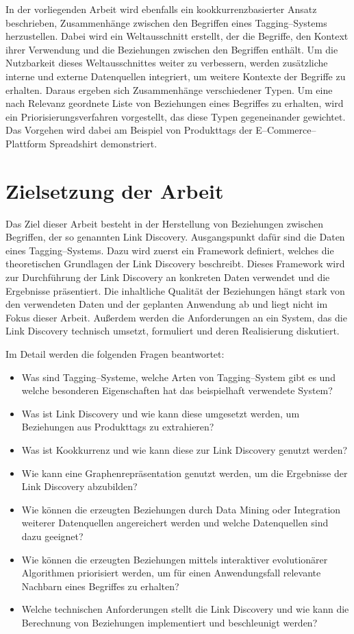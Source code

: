 In der vorliegenden Arbeit wird ebenfalls ein kookkurrenzbasierter Ansatz beschrieben, Zusammenhänge zwischen den Begriffen eines Tagging--Systems herzustellen. Dabei wird ein Weltausschnitt erstellt, der die Begriffe, den Kontext ihrer Verwendung und die Beziehungen zwischen den Begriffen enthält. Um die Nutzbarkeit dieses Weltausschnittes weiter zu verbessern, werden zusätzliche interne und externe Datenquellen integriert, um weitere Kontexte der Begriffe zu erhalten. Daraus ergeben sich Zusammenhänge verschiedener Typen. Um eine nach Relevanz geordnete Liste von Beziehungen eines Begriffes zu erhalten, wird ein Priorisierungsverfahren vorgestellt, das diese Typen gegeneinander gewichtet. Das Vorgehen wird dabei am Beispiel von Produkttags der E--Commerce--Plattform Spreadshirt demonstriert.

\section{Zielsetzung der Arbeit}

Das Ziel dieser Arbeit besteht in der Herstellung von Beziehungen zwischen Begriffen, der so genannten Link Discovery. Ausgangspunkt dafür sind die Daten eines Tagging--Systems. Dazu wird zuerst ein Framework definiert, welches die theoretischen Grundlagen der Link Discovery beschreibt. Dieses Framework wird zur Durchführung der Link Discovery an konkreten Daten verwendet und die Ergebnisse präsentiert. Die inhaltliche Qualität der Beziehungen hängt stark von den verwendeten Daten und der geplanten Anwendung ab und liegt nicht im Fokus dieser Arbeit. Außerdem werden die Anforderungen an ein System, das die Link Discovery technisch umsetzt, formuliert und deren Realisierung diskutiert.

Im Detail werden die folgenden Fragen beantwortet:

\begin{itemize}
    \item Was sind Tagging--Systeme, welche Arten von Tagging--System gibt es und welche besonderen Eigenschaften hat das beispielhaft verwendete System?
    \item Was ist Link Discovery und wie kann diese umgesetzt werden, um Beziehungen aus Produkttags zu extrahieren?
    \item Was ist Kookkurrenz und wie kann diese zur Link Discovery genutzt werden?
    \item Wie kann eine Graphenrepräsentation genutzt werden, um die Ergebnisse der Link Discovery abzubilden?
    \item Wie können die erzeugten Beziehungen durch Data Mining oder Integration weiterer Datenquellen angereichert werden und welche Datenquellen sind dazu geeignet?
    \item Wie können die erzeugten Beziehungen mittels interaktiver evolutionärer Algorithmen priorisiert werden, um für einen Anwendungsfall relevante Nachbarn eines Begriffes zu erhalten?
    \item Welche technischen Anforderungen stellt die Link Discovery und wie kann die Berechnung von Beziehungen implementiert und beschleunigt werden?
\end{itemize}

